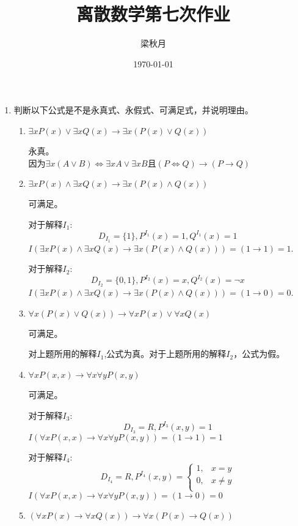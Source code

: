 \documentclass[UTF8]{ctexart}
\title{离散数学第七次作业}
\author{梁秋月}
\date{\today}
\begin{document}
    \maketitle
    \begin{enumerate}
        \item 判断以下公式是不是永真式、永假式、可满足式，并说明理由。
        \begin{enumerate}
            \item $ \exists xP(x)\vee \exists xQ(x)\rightarrow \exists x(P(x)\vee Q(x)) $
            
            永真。\\ 因为$\exists x(A \vee B)\Leftrightarrow \exists x A \vee \exists x B$且$(P\Leftrightarrow Q) \rightarrow (P\rightarrow Q)$
            \item $ \exists xP(x)\wedge \exists xQ(x)\rightarrow \exists x(P(x)\wedge Q(x))$
            
            可满足。
            
            对于解释$I_1$:
            \[
                D_{I_1}=\{1\},P^{I_1}(x)=1,Q^{I_1}(x)=1
            \]
            $I(\exists xP(x)\wedge \exists xQ(x)\rightarrow \exists x(P(x)\wedge Q(x)))=(1\rightarrow 1)=1$.

            对于解释$I_2$:
            \[
                D_{I_2}=\{0,1\},P^{I_2}(x)=x,Q^{I_2}(x)=\neg x
            \]
            $I(\exists xP(x)\wedge \exists xQ(x)\rightarrow \exists x(P(x)\wedge Q(x)))=(1\rightarrow 0)=0$.
            \item $\forall x(P(x)\vee Q(x))\rightarrow \forall xP(x)\vee \forall xQ(x)$
            
            可满足。
            
            对上题所用的解释$I_1$,公式为真。对于上题所用的解释$I_2$，公式为假。

            \item $ \forall xP(x,x)\rightarrow \forall x\forall yP(x,y)$
            
            可满足。
            
            对于解释$I_3$:
            \[
                D_{I_3}=R,P^{I_3}(x,y)=1
            \]
            $I(\forall xP(x,x)\rightarrow \forall x\forall yP(x,y))=(1\rightarrow 1)=1$

            对于解释$I_4$:
            \[
                D_{I_4}=R,P^{I_4}(x,y)=
                \begin{cases}
                    1, &x=y\\
                    0, &x\neq y\\
                \end{cases}
            \]
            $I(\forall xP(x,x)\rightarrow \forall x\forall yP(x,y))=(1\rightarrow 0)=0$
            \item $ (\forall xP(x)\rightarrow \forall xQ(x))\rightarrow \forall x(P(x)\rightarrow Q(x))$
            

\end{enumerate}
\end{enumerate}
\end{document}
